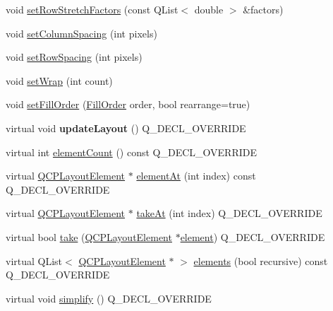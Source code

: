 \begin{DoxyCompactItemize}
\item 
void \hyperlink{classQCPLayoutGrid_a200b45f9c908f96ebadaa3c8d87a2782}{set\+Row\+Stretch\+Factors} (const Q\+List$<$ double $>$ \&factors)
\item 
void \hyperlink{classQCPLayoutGrid_a3a49272aba32bb0fddc3bb2a45a3dba0}{set\+Column\+Spacing} (int pixels)
\item 
void \hyperlink{classQCPLayoutGrid_aaef2cd2d456197ee06a208793678e436}{set\+Row\+Spacing} (int pixels)
\item 
void \hyperlink{classQCPLayoutGrid_ab36af18d77e4428386d02970382ee598}{set\+Wrap} (int count)
\item 
void \hyperlink{classQCPLayoutGrid_affc2f3cfd22f28698c5b29b960d2a391}{set\+Fill\+Order} (\hyperlink{classQCPLayoutGrid_a7d49ee08773de6b2fd246edfed353cca}{Fill\+Order} order, bool rearrange=true)
\item 
\mbox{\label{classQCPLayoutGrid_a6cf43f14d3fa335fd8758561ccf1f78c}} 
virtual void {\bfseries update\+Layout} () Q\+\_\+\+D\+E\+C\+L\+\_\+\+O\+V\+E\+R\+R\+I\+DE
\item 
virtual int \hyperlink{classQCPLayoutGrid_a9a8942aface780a02445ebcf14c48513}{element\+Count} () const Q\+\_\+\+D\+E\+C\+L\+\_\+\+O\+V\+E\+R\+R\+I\+DE
\item 
virtual \hyperlink{classQCPLayoutElement}{Q\+C\+P\+Layout\+Element} $\ast$ \hyperlink{classQCPLayoutGrid_a4288f174082555f6bd92021bdedb75dc}{element\+At} (int index) const Q\+\_\+\+D\+E\+C\+L\+\_\+\+O\+V\+E\+R\+R\+I\+DE
\item 
virtual \hyperlink{classQCPLayoutElement}{Q\+C\+P\+Layout\+Element} $\ast$ \hyperlink{classQCPLayoutGrid_a17dd220234d1bbf8835abcc666384d45}{take\+At} (int index) Q\+\_\+\+D\+E\+C\+L\+\_\+\+O\+V\+E\+R\+R\+I\+DE
\item 
virtual bool \hyperlink{classQCPLayoutGrid_aee961c2eb6cf8a85dcbc5a7d7b6c1a00}{take} (\hyperlink{classQCPLayoutElement}{Q\+C\+P\+Layout\+Element} $\ast$\hyperlink{classQCPLayoutGrid_a602b426609b4411cf6a93c3ddf3a381a}{element}) Q\+\_\+\+D\+E\+C\+L\+\_\+\+O\+V\+E\+R\+R\+I\+DE
\item 
virtual Q\+List$<$ \hyperlink{classQCPLayoutElement}{Q\+C\+P\+Layout\+Element} $\ast$ $>$ \hyperlink{classQCPLayoutGrid_a7d5b968b4cf57393e9e387976d91f8f7}{elements} (bool recursive) const Q\+\_\+\+D\+E\+C\+L\+\_\+\+O\+V\+E\+R\+R\+I\+DE
\item 
virtual void \hyperlink{classQCPLayoutGrid_a38621ca7aa633b6a9a88617df7f08672}{simplify} () Q\+\_\+\+D\+E\+C\+L\+\_\+\+O\+V\+E\+R\+R\+I\+DE

\end{DoxyCompactItemize}
